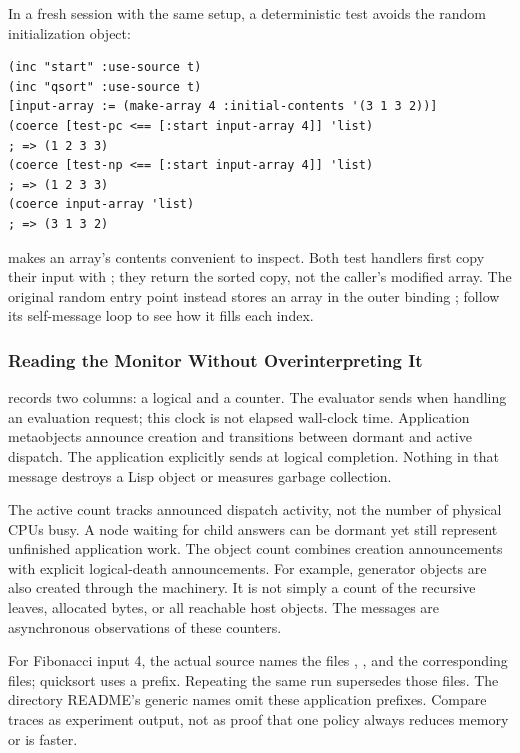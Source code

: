 In a fresh session with the same setup, a deterministic test avoids
the random initialization object:

\begin{codeblock}
\begin{lstlisting}
(inc "start" :use-source t)
(inc "qsort" :use-source t)
[input-array := (make-array 4 :initial-contents '(3 1 3 2))]
(coerce [test-pc <== [:start input-array 4]] 'list)
; => (1 2 3 3)
(coerce [test-np <== [:start input-array 4]] 'list)
; => (1 2 3 3)
(coerce input-array 'list)
; => (3 1 3 2)
\end{lstlisting}
\end{codeblock}

 makes an array's contents convenient to inspect.
Both test handlers first copy their input with
; they return the sorted copy,
not the caller's modified array. The original random entry point
\code{[init <= N]} instead stores an array in the outer binding
; follow its  self-message loop to see
how it fills each index.

\subsubsection{Reading the Monitor Without Overinterpreting It}
\label{sec:pcontrol-monitor}

 records two columns: a logical
 and a counter. The evaluator sends 
when handling an evaluation request; this clock is not elapsed
wall-clock time. Application metaobjects announce creation and
transitions between dormant and active dispatch. The application
explicitly sends  at logical completion.
Nothing in that message destroys a Lisp object or measures garbage
collection.

The active count tracks announced dispatch activity, not the number
of physical CPUs busy. A node waiting for child answers can be
dormant yet still represent unfinished application work.
The object count combines creation announcements with explicit
logical-death announcements. For example, generator objects are
also created through the machinery. It is not simply a count of
the recursive leaves, allocated bytes, or all reachable host objects.
The  messages are asynchronous observations of these
counters.

For Fibonacci input 4, the actual source names the files
, , and
the corresponding  files; quicksort uses a 
prefix. Repeating the same run supersedes those files.
The directory README's generic names omit these application prefixes.
Compare traces as experiment output, not as proof that one policy
always reduces memory or is faster.

